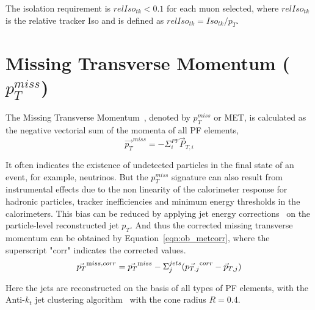 \vspace{0.3cm}
The isolation requirement is $relIso_{tk}<0.1$ for each muon selected, where $relIso_{tk}$ is the relative tracker Iso and is defined as $relIso_{tk}=Iso_{tk}/p_{T}$.

\section{Missing Transverse Momentum ($p_T ^{miss}$)}
The Missing Transverse Momentum~\cite{ob_metconst}, denoted by $p_T ^{miss}$ or MET, is calculated as the negative vectorial sum of the momenta of all PF elements,
\begin{equation}
\vec{p_T} ^{miss} = -\Sigma_{i}^{PF} \vec{P}_{T,i}
\label{eqn:ob_metdef}
\end{equation}

It often indicates the existence of undetected particles in the final state of an event, for example, neutrinos. But the $p_T ^{miss}$ signature can also result from instrumental effects due to the non linearity of the calorimeter response for hadronic particles, tracker inefficiencies and minimum energy thresholds in the calorimeters. This bias can be reduced by applying jet energy corrections~\cite{ob_jetcorr} on the particle-level reconstructed jet $p_T$. And thus the corrected missing transverse momentum can be obtained by Equation~\ref{eqn:ob_metcorr}, where the superscript "corr" indicates the corrected values.
\begin{equation}
\vec{p_T}^{\text miss,corr} = \vec{p_T} ^{\text miss} - \Sigma_{j}^{jets} (\vec{p_{T,j}} ^{\text corr} - \vec{p}_{T,j} )
\label{eqn:ob_metcorr}
\end{equation}

Here the jets are reconstructed on the basis of all types of PF elements, with the Anti-$k_t$ jet clustering algorithm~\cite{ob_jetantikt} with the cone radius $R=0.4$.


